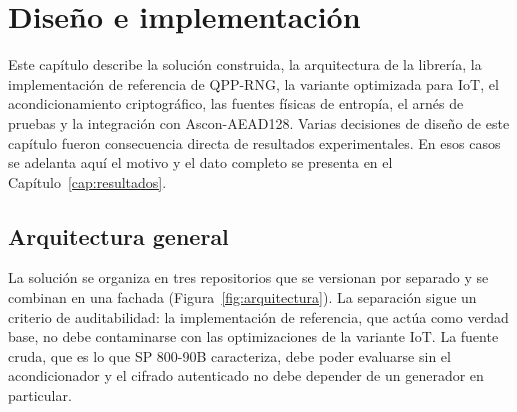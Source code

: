 \chapter{Diseño e implementación}
\label{cap:diseno}

Este capítulo describe la solución construida, la arquitectura de la librería, la implementación de referencia de QPP-RNG, la variante optimizada para IoT, el acondicionamiento criptográfico, las fuentes físicas de entropía, el arnés de pruebas y la integración con Ascon-AEAD128. Varias decisiones de diseño de este capítulo fueron consecuencia directa de resultados experimentales. En esos casos se adelanta aquí el motivo y el dato completo se presenta en el Capítulo~\ref{cap:resultados}.

\section{Arquitectura general}
\label{sec:arquitectura}

La solución se organiza en tres repositorios que se versionan por separado y se combinan en una fachada (Figura~\ref{fig:arquitectura}). La separación sigue un criterio de auditabilidad: la implementación de referencia, que actúa como verdad base, no debe contaminarse con las optimizaciones de la variante IoT. La fuente cruda, que es lo que SP 800-90B caracteriza, debe poder evaluarse sin el acondicionador y el cifrado autenticado no debe depender de un generador en particular.

